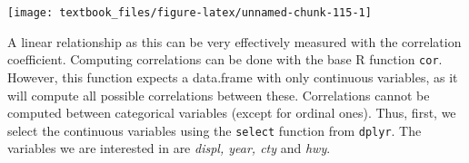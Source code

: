 \documentclass[]{tufte-book}
\newenvironment{Shaded}{}{}
\newcommand{\KeywordTok}[1]{\textcolor[rgb]{0.00,0.44,0.13}{\textbf{#1}}}
\newcommand{\NormalTok}[1]{#1}
\newcommand{\OperatorTok}[1]{\textcolor[rgb]{0.40,0.40,0.40}{#1}}
\newcommand{\StringTok}[1]{\textcolor[rgb]{0.25,0.44,0.63}{#1}}
\begin{document}
\texttt{[image: textbook\_files/figure-latex/unnamed-chunk-115-1]}

A linear relationship as this can be very effectively measured with the correlation coefficient. Computing correlations can be done with the base R function \texttt{cor}. However, this function expects a data.frame with only continuous variables, as it will compute all possible correlations between these. Correlations cannot be computed between categorical variables (except for ordinal ones). Thus, first, we select the continuous variables using the \texttt{select} function from \texttt{dplyr}. The variables we are interested in are \emph{displ, year, cty} and \emph{hwy}.

\begin{Shaded}
\end{Shaded}
\end{document}
